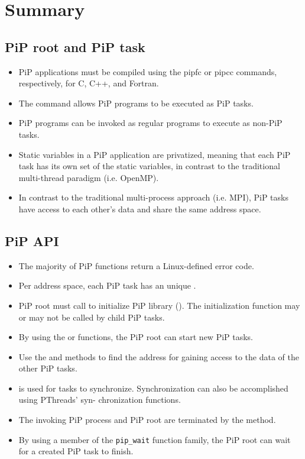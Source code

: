 
\section{Summary}

\subsection*{PiP root and PiP task}

\begin{itemize}
\item PiP applications must be compiled using the pipfc or pipcc
  commands, respectively, for C, C++, and Fortran.
\item The  command allows PiP programs to be executed as PiP
  tasks.
\item PiP programs can be invoked as regular programs to execute as
  non-PiP tasks.
\item Static variables in a PiP application are privatized, meaning
  that each PiP task has its own set of the static variables, in
  contrast to the traditional multi-thread paradigm (i.e. OpenMP).
\item In contrast to the traditional multi-process approach
  (i.e. MPI), PiP tasks have access to each other's data and share
  the same address space.
\end{itemize}

\subsection*{PiP API}

\begin{itemize}
\item The majority of PiP functions return a Linux-defined error code.
\item Per address space, each PiP task has an unique {\PIPID}.
\item PiP root must call  to initialize PiP library (). The
  initialization function may or may not be called by child PiP tasks.
\item By using the  or
   functions, the PiP root can start new PiP
  tasks. 
\item Use the  and
   methods to find the address for gaining
  access to the data of the other PiP tasks.
\item {} is used for tasks to
  synchronize. Synchronization can also be accomplished using
  PThreads' syn- chronization functions. 
\item The invoking PiP process and PiP root are terminated by the
   method. 
\item By using a member of the {\tt pip_wait} function family, the PiP
  root can wait for a created PiP task to finish.
\end{itemize}
 
